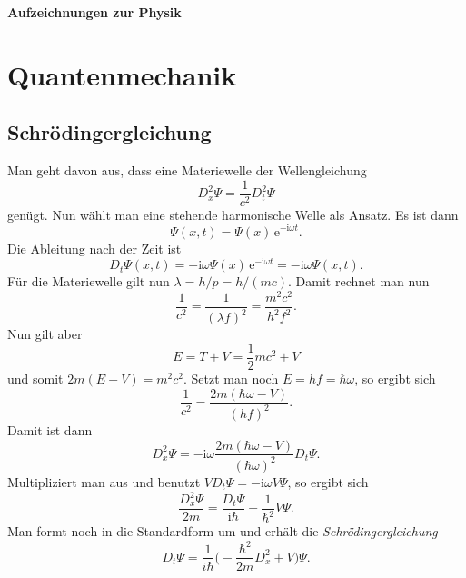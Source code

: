 \documentclass[a4paper,11pt,fleqn,twocolumn,twoside,dvipdfmx]{scrartcl}
\numberwithin{equation}{section}
\newcommand{\ui}{\mathrm i}
\newcommand{\ee}{\mathrm e}
\begin{document}
\thispagestyle{empty}

\noindent
{\LARGE\normalfont\bfseries Aufzeichnungen zur Physik}
\tableofcontents

\section{Quantenmechanik}
\subsection{Schrödingergleichung}

Man geht davon aus, dass eine Materiewelle der Wellengleichung
\begin{equation}
D_x^2\Psi = \frac{1}{c^2}D_t^2\Psi
\end{equation}
genügt. Nun wählt man eine stehende harmonische Welle als Ansatz.
Es ist dann
\begin{equation}
\Psi(x,t) = \Psi(x)\,\ee^{-\ui\omega t}.
\end{equation}
Die Ableitung nach der Zeit ist
\begin{equation}
D_t\Psi(x,t) = -\ui\omega\Psi(x)\,\ee^{-\ui\omega t}
= -\ui\omega\Psi(x,t).
\end{equation}
Für die Materiewelle gilt nun $\lambda=h/p=h/(mc)$. Damit rechnet
man nun
\begin{equation}
\frac{1}{c^2} = \frac{1}{(\lambda f)^2}
= \frac{m^2 c^2}{h^2 f^2}.
\end{equation}
Nun gilt aber
\begin{equation}
E=T+V=\frac{1}{2}mc^2+V
\end{equation}
und somit $2m(E-V)=m^2 c^2$. Setzt man noch $E=hf=\hbar\omega$,
so ergibt sich
\begin{equation}
\frac{1}{c^2} = \frac{2m(\hbar\omega-V)}{(hf)^2}.
\end{equation}
Damit ist dann
\begin{equation}
D_x^2\Psi
= -\ui\omega\frac{2m(\hbar\omega-V)}{(\hbar\omega)^2}D_t\Psi.
\end{equation}
Multipliziert man aus und benutzt $VD_t\Psi=-\ui\omega V\Psi$,
so ergibt sich
\begin{equation}
\frac{D_x^2\Psi}{2m}
= \frac{D_t\Psi}{\ui\hbar}+\frac{1}{\hbar^2}V\Psi.
\end{equation}
Man formt noch in die Standardform um und erhält die
\emph{Schrödingergleichung}
\begin{equation}
D_t\Psi = \frac{1}{i\hbar}\Big(-\frac{\hbar^2}{2m}D_x^2+V\Big)\Psi.
\end{equation}
\end{document}

